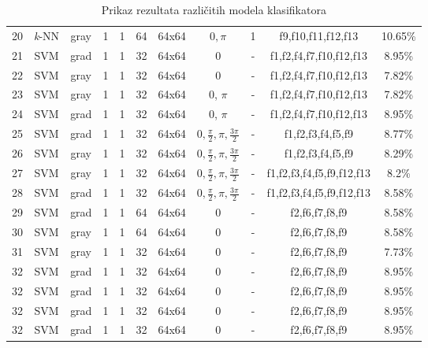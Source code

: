 \documentclass[times, utf8, zavrsni]{fer}
\begin{document}
\begin{adjustwidth}{-30pt}{0pt}
\begin{tabular}{c|c|c|c|c|c|c|c|c|c|c}
\end{tabular}
\end{adjustwidth}

\newpage

\begin{table}[ht]
\begin{adjustwidth}{-30pt}{0pt}
\begin{tabular}{c|c|c|c|c|c|c|c|c|c|c}
20 & \textit{k}-NN & gray & 1 & 1 & 64 & 64x64 & \(0, \pi\)& 1 & f9,f10,f11,f12,f13 & 10.65\% \\
21 & SVM & grad & 1 & 1 & 32 & 64x64 & 0 & - & f1,f2,f4,f7,f10,f12,f13 & 8.95\% \\
22 & SVM & gray & 1 & 1 & 32 & 64x64 & 0 & - & f1,f2,f4,f7,f10,f12,f13 & 7.82\% \\
23 & SVM & gray & 1 & 1 & 32 & 64x64 & 0, \(\pi\) & - & f1,f2,f4,f7,f10,f12,f13 & 7.82\% \\
24 & SVM & grad & 1 & 1 & 32 & 64x64 & 0, \(\pi\) & - & f1,f2,f4,f7,f10,f12,f13 & 8.95\% \\
25 & SVM & grad & 1 & 1 & 32 & 64x64 & \(0, \frac{\pi}{2}, \pi, \frac{3\pi}{2}\) & - & f1,f2,f3,f4,f5,f9 & 8.77\% \\
26 & SVM & gray & 1 & 1 & 32 & 64x64 & \(0, \frac{\pi}{2}, \pi, \frac{3\pi}{2}\) & - & f1,f2,f3,f4,f5,f9 & 8.29\% \\
27 & SVM & gray & 1 & 1 & 32 & 64x64 & \(0, \frac{\pi}{2}, \pi, \frac{3\pi}{2}\) & - & f1,f2,f3,f4,f5,f9,f12,f13 & 8.2\% \\
28 & SVM & grad & 1 & 1 & 32 & 64x64 & \(0, \frac{\pi}{2}, \pi, \frac{3\pi}{2}\) & - & f1,f2,f3,f4,f5,f9,f12,f13 & 8.58\% \\
29 & SVM & grad & 1 & 1 & 64 & 64x64 & 0 & - & f2,f6,f7,f8,f9 & 8.58\% \\
30 & SVM & gray & 1 & 1 & 64 & 64x64 & 0 & - & f2,f6,f7,f8,f9 & 8.58\% \\
31 & SVM & gray & 1 & 1 & 32 & 64x64 & 0 & - & f2,f6,f7,f8,f9 & 7.73\% \\
32 & SVM & grad & 1 & 1 & 32 & 64x64 & 0 & - & f2,f6,f7,f8,f9 & 8.95\% \\
32 & SVM & grad & 1 & 1 & 32 & 64x64 & 0 & - & f2,f6,f7,f8,f9 & 8.95\% \\
32 & SVM & grad & 1 & 1 & 32 & 64x64 & 0 & - & f2,f6,f7,f8,f9 & 8.95\% \\
32 & SVM & grad & 1 & 1 & 32 & 64x64 & 0 & - & f2,f6,f7,f8,f9 & 8.95\% \\
\end{tabular}
\end{adjustwidth}
\caption{Prikaz rezultata različitih modela klasifikatora} 
\end{table}
\end{document}
